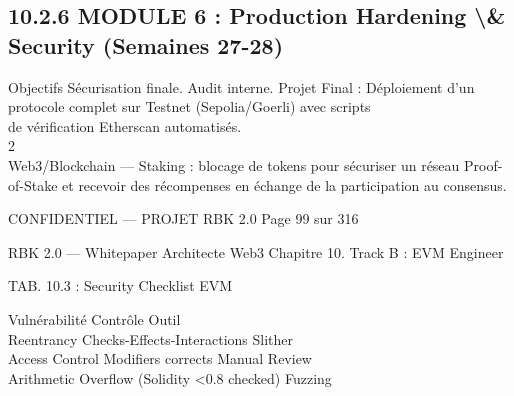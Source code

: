 \documentclass[12pt,landscape,a4paper]{article}
\newenvironment{confidential}
{\begin{tcolorbox}[
    colback=rbkred!5!white,
    colframe=rbkred!75!black,
    title=CONFIDENTIEL,
    fonttitle=\bfseries\color{white},
    coltitle=rbkred!75!black,
    breakable,
    enhanced,
    frame hidden,
    borderline west={2pt}{0pt}{rbkred!75!black}
]}
{\end{tcolorbox}}
\begin{document}
\subsection{10.2.6 MODULE 6 : Production Hardening \textbackslash{}& Security (Semaines 27-28)}
Objectifs Sécurisation finale. Audit interne. Projet Final : Déploiement d’un protocole complet sur Testnet (Sepolia/Goerli) avec scripts\\
de vérification Etherscan automatisés.\\
2\\
Web3/Blockchain — Staking : blocage de tokens pour sécuriser un réseau Proof-of-Stake et recevoir des récompenses en échange de la participation au consensus.\\
\vspace{0.5em}
\vspace{0.5em}
\vspace{0.5em}
\vspace{0.5em}
\begin{confidential}CONFIDENTIEL — PROJET RBK 2.0                                             Page 99 sur 316\end{confidential}
RBK 2.0 — Whitepaper Architecte Web3                                                                   Chapitre 10. Track B : EVM Engineer\\
\vspace{0.5em}
\vspace{0.5em}
\begin{center}\begin{tabular}TAB. 10.3 : Security Checklist EVM\end{tabular}\end{center}
\vspace{0.5em}
\vspace{0.5em}
Vulnérabilité Contrôle                          Outil\\
Reentrancy     Checks-Effects-Interactions      Slither\\
Access Control Modifiers corrects               Manual Review\\
Arithmetic     Overflow (Solidity \textless{}0.8 checked) Fuzzing\\
\vspace{0.5em}
\vspace{0.5em}
\vspace{0.5em}
\vspace{0.5em}
\end{document}
